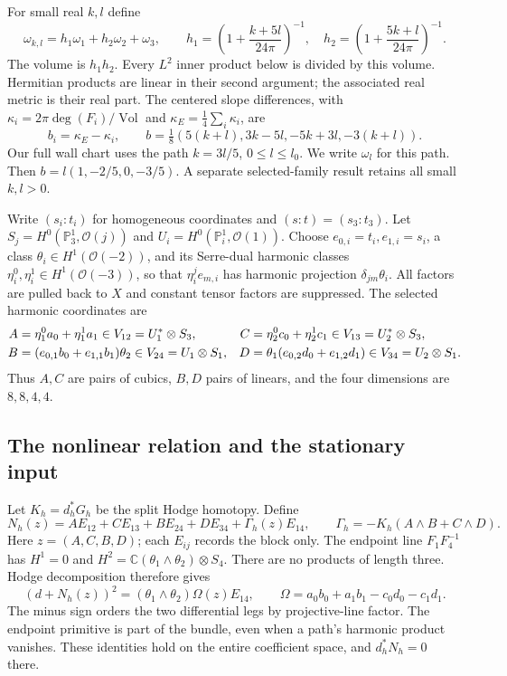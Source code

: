\documentclass[11pt]{amsart}
\theoremstyle{definition}
\theoremstyle{remark}
\newcommand{\CC}{\mathbb C}
\newcommand{\PP}{\mathbb P}
\newcommand{\cO}{\mathcal O}
\newcommand{\Vol}{\operatorname{Vol}}
\begin{document}
For small real $k,l$ define
\begin{equation}\label{eq:polarization}
 \omega_{k,l}=h_1\omega_1+h_2\omega_2+\omega_3,\qquad
 h_1=\left(1+\frac{k+5l}{24\pi}\right)^{-1},\quad
 h_2=\left(1+\frac{5k+l}{24\pi}\right)^{-1}.
\end{equation}
The volume is $h_1h_2$. Every $L^2$ inner product below is divided
by this volume. Hermitian products are linear in their second argument;
the associated real metric is their real part. The centered slope differences,
with $\kappa_i=2\pi\deg(F_i)/\Vol$ and
$\kappa_E=\frac14\sum_i\kappa_i$, are
\begin{equation}\label{eq:slope-demands}
 b_i=\kappa_E-\kappa_i,\qquad
 b=\tfrac18(5(k+l),3k-5l,-5k+3l,-3(k+l)).
\end{equation}
Our full wall chart uses the path $k=3l/5$, $0\le l\le l_0$.
We write $\omega_l$ for this path. Then
$b=l(1,-2/5,0,-3/5)$. A separate selected-family result retains
all small $k,l>0$.

Write $(s_i:t_i)$ for homogeneous coordinates and $(s:t)=(s_3:t_3)$.
Let $S_j=H^0(\PP^1_3,\cO(j))$ and
$U_i=H^0(\PP^1_i,\cO(1))$. Choose $e_{0,i}=t_i,e_{1,i}=s_i$,
a class $\theta_i\in H^1(\cO(-2))$, and its Serre-dual harmonic
classes $\eta_i^0,\eta_i^1\in H^1(\cO(-3))$, so that
$\eta_i^je_{m,i}$ has harmonic projection $\delta_{jm}\theta_i$.
All factors are pulled back to $X$ and constant tensor factors are
suppressed. The selected harmonic coordinates are
\begin{align}
 A&=\eta_1^0a_0+\eta_1^1a_1\in V_{12}=U_1^*\otimes S_3,
 &C&=\eta_2^0c_0+\eta_2^1c_1\in V_{13}=U_2^*\otimes S_3,
 \notag\\
 B&=(e_{0,1}b_0+e_{1,1}b_1)\theta_2\in V_{24}=U_1\otimes S_1,
 &D&=\theta_1(e_{0,2}d_0+e_{1,2}d_1)\in V_{34}=U_2\otimes S_1.
 \label{eq:selected-coordinates}
\end{align}
Thus $A,C$ are pairs of cubics, $B,D$ pairs of linears, and the
four dimensions are $8,8,4,4$.

\subsection{The nonlinear relation and the stationary input}
Let $K_h=d_h^*G_h$ be the split Hodge homotopy. Define
\begin{equation}\label{eq:selected-reconstruction}
 N_h(z)=AE_{12}+CE_{13}+BE_{24}+DE_{34}+\Gamma_h(z)E_{14},\qquad
 \Gamma_h=-K_h(A\wedge B+C\wedge D).
\end{equation}
Here $z=(A,C,B,D)$; each $E_{ij}$ records the block only.
The endpoint line $F_1F_4^{-1}$ has $H^1=0$ and
$H^2=\CC(\theta_1\wedge\theta_2)\otimes S_4$.
There are no products of length three. Hodge decomposition therefore gives
\begin{equation}\label{eq:selected-obstruction}
 (d+N_h(z))^2=(\theta_1\wedge\theta_2)\Omega(z)E_{14},\qquad
 \Omega=a_0b_0+a_1b_1-c_0d_0-c_1d_1.
\end{equation}
The minus sign orders the two differential legs by projective-line factor.
The endpoint primitive is part of the bundle, even when a path's harmonic
product vanishes. These identities hold on the entire coefficient space,
and $d_h^*N_h=0$ there.
\end{document}
